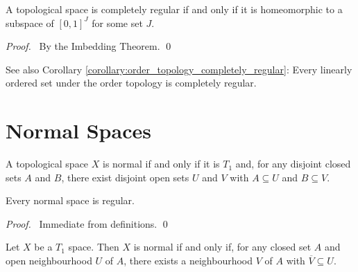 \begin{theorem}
    A topological space is completely regular if and only if it is homeomorphic to
    a subspace of $[0,1]^J$ for some set $J$.
\end{theorem}

\begin{proof}
    \pf\ By the Imbedding Theorem. \qed
\end{proof}

See also Corollary \ref{corollary:order_topology_completely_regular}: Every linearly ordered set under the
order topology is completely regular.

\section{Normal Spaces}

\begin{definition}[Normal]
    A topological space $X$ is normal if and only if it is $T_1$ and, for any
    disjoint closed sets $A$ and $B$, there exist disjoint open sets $U$ and $V$
    with $A \subseteq U$ and $B \subseteq V$.
\end{definition}

\begin{proposition}
    Every normal space is regular.
\end{proposition}

\begin{proof}
    \pf\ Immediate from definitions. \qed
\end{proof}

\begin{proposition}
    \label{proposition:normal_neighbourhoods}
    Let $X$ be a $T_1$ space. Then $X$ is normal if and only if, for any closed
    set $A$ and open neighbourhood $U$ of $A$, there exists a neighbourhood
    $V$ of $A$ with $\overline{V} \subseteq U$.
\end{proposition}


